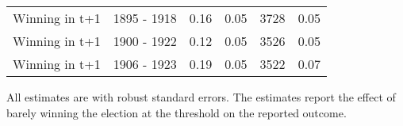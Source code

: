 \begin{table}
\begin{threeparttable}
\begin{tabular}[t]{llrrrr}
Winning in t+1 & 1895 - 1918 & 0.16 & 0.05 & 3728 & 0.05\\
Winning in t+1 & 1900 - 1922 & 0.12 & 0.05 & 3526 & 0.05\\
Winning in t+1 & 1906 - 1923 & 0.19 & 0.05 & 3522 & 0.07\\
\bottomrule
\end{tabular}
\begin{tablenotes}[para]
\item All estimates are with robust standard errors. The estimates report the effect of barely winning the election at the threshold on the reported outcome.
\end{tablenotes}
\end{threeparttable}
\end{table}